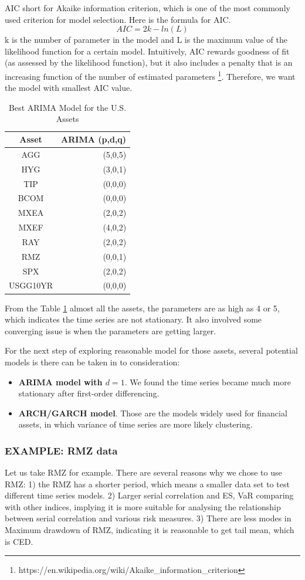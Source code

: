 \documentclass[12pt]{article}
\begin{document}
AIC short for Akaike information criterion, which is one of the most commonly used criterion for model selection. Here is the formula for AIC.
\[
AIC = 2k - ln(L)
\]
k is the number of parameter in the model and L is the maximum value of the likelihood function for a certain model. Intuitively, AIC rewards goodness of fit (as assessed by the likelihood function), but it also includes a penalty that is an increasing function of the number of estimated parameters \footnote{https://en.wikipedia.org/wiki/Akaike\_information\_criterion}. Therefore, we want the model with smallest AIC value.

\begin{table}[!h]
\caption{Best ARIMA Model for the U.S. Assets }
\centering 
\begin{tabular}{ | c || r | } 
 \hline
Asset & ARIMA (p,d,q) \\
  \hline \hline
AGG & (5,0,5) \\ 
HYG & (3,0,1) \\ 
TIP &  (0,0,0)\\ 
BCOM & (0,0,0)\\ 
MXEA & (2,0,2) \\ 
MXEF & (4,0,2)\\ 
RAY &  (2,0,2)\\ 
RMZ & (0,0,1) \\ 
SPX & (2,0,2) \\ 
USGG10YR & (0,0,0) \\
 \hline
\end{tabular}
\label{table:BestArima}
\end{table}

From the Table \ref{table:BestArima} almost all the assets, the parameters are as high as 4 or 5, which indicates the time series are not stationary. It also involved some converging issue is when the parameters are getting larger.

For the next step of exploring reasonable model for those assets, several potential models is there can be taken in to consideration:
\begin{itemize}
\item \textbf{ARIMA model with $d=1$}. We found the time series became much more stationary after first-order differencing. 
\item \textbf{ARCH/GARCH model}. Those are the models widely used for financial assets, in which variance of time series are more likely clustering.
\end{itemize}

\subsubsection{EXAMPLE: RMZ data}
Let us take RMZ for example. There are several reasons why we chose to use RMZ: 1) the RMZ has a shorter period, which means a smaller data set to test different time series models. 2) Larger serial correlation and ES, VaR comparing with other indices, implying it is more suitable for analysing the relationship between serial correlation and various risk measures. 3) There are less modes in Maximum drawdown of RMZ, indicating it is reasonable to get tail mean, which is CED.
\end{document}

